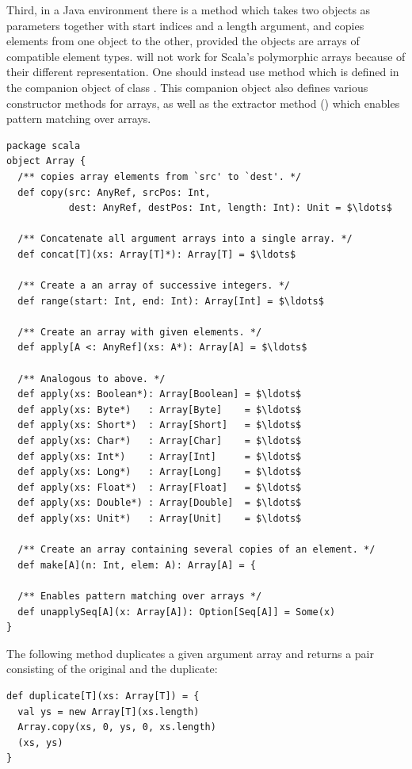 Third, in a Java environment there is a method 
which takes two objects as parameters together with start indices and
a length argument, and copies elements from one object to the other,
provided the objects are arrays of compatible element
types.  will not work for Scala's polymorphic
arrays because of their different representation. One should instead
use method  which is defined in the companion object
of class \lstinline@Array@. This companion object also defines various
constructor methods for arrays, as well as 
the extractor method  ()
which enables pattern matching over arrays.
\begin{lstlisting}
package scala
object Array { 
  /** copies array elements from `src' to `dest'. */
  def copy(src: AnyRef, srcPos: Int, 
           dest: AnyRef, destPos: Int, length: Int): Unit = $\ldots$

  /** Concatenate all argument arrays into a single array. */
  def concat[T](xs: Array[T]*): Array[T] = $\ldots$

  /** Create a an array of successive integers. */
  def range(start: Int, end: Int): Array[Int] = $\ldots$

  /** Create an array with given elements. */
  def apply[A <: AnyRef](xs: A*): Array[A] = $\ldots$

  /** Analogous to above. */
  def apply(xs: Boolean*): Array[Boolean] = $\ldots$
  def apply(xs: Byte*)   : Array[Byte]    = $\ldots$
  def apply(xs: Short*)  : Array[Short]   = $\ldots$
  def apply(xs: Char*)   : Array[Char]    = $\ldots$
  def apply(xs: Int*)    : Array[Int]     = $\ldots$
  def apply(xs: Long*)   : Array[Long]    = $\ldots$
  def apply(xs: Float*)  : Array[Float]   = $\ldots$
  def apply(xs: Double*) : Array[Double]  = $\ldots$
  def apply(xs: Unit*)   : Array[Unit]    = $\ldots$

  /** Create an array containing several copies of an element. */
  def make[A](n: Int, elem: A): Array[A] = {

  /** Enables pattern matching over arrays */
  def unapplySeq[A](x: Array[A]): Option[Seq[A]] = Some(x)
}
\end{lstlisting}

\example The following method duplicates a given argument array and returns a pair consisting of the original and the duplicate:
\begin{lstlisting}
def duplicate[T](xs: Array[T]) = {
  val ys = new Array[T](xs.length)
  Array.copy(xs, 0, ys, 0, xs.length)
  (xs, ys)
}
\end{lstlisting}

